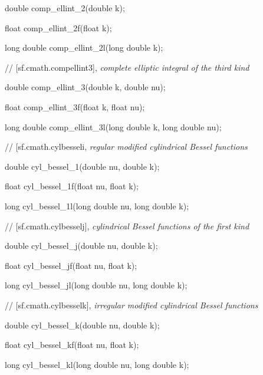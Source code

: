  double comp\_ellint\_2(double k);
	
 float comp\_ellint\_2f(float k);
	
 long double comp\_ellint\_2l(long double k);

\vspace{2ex}
// [sf.cmath.comp{\bigund}ellint{\bigund}3], {\it complete elliptic integral of the third kind}
\vspace{2ex}

 double comp\_ellint\_3(double k, double nu);
	
 float comp\_ellint\_3f(float k, float nu);
	
 long double comp\_ellint\_3l(long double k, long double nu);

\vspace{2ex}
// [sf.cmath.cyl{\bigund}bessel{\bigund}i, {\it regular modified cylindrical Bessel functions}
\vspace{2ex}

 double cyl\_bessel\_1(double nu, double k);
	
 float cyl\_bessel\_1f(float nu, float k);
	
 long cyl\_bessel\_1l(long double nu, long double k);

\vspace{2ex}
// [sf.cmath.cyl{\bigund}bessel{\bigund}j], {\it cylindrical Bessel functions of the first kind}
\vspace{2ex}

 double cyl\_bessel\_j(double nu, double k);
	
 float cyl\_bessel\_jf(float nu, float k);
	
 long cyl\_bessel\_jl(long double nu, long double k);

\vspace{2ex}
// [sf.cmath.cyl{\bigund}bessel{\bigund}k], {\it irregular modified cylindrical Bessel functions}
\vspace{2ex}

 double cyl\_bessel\_k(double nu, double k);
	
 float cyl\_bessel\_kf(float nu, float k);
	
 long cyl\_bessel\_kl(long double nu, long double k);

